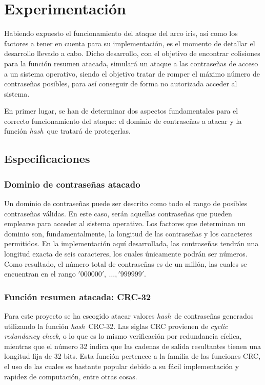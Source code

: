 \documentclass[12pt,spanish,listoffigures,listoftables,listofalgorithms]{tfgetsinf}
\newcommand{\hash}{\textit{hash}}
\begin{document}
\chapter{Experimentación}

Habiendo expuesto el funcionamiento del ataque del arco iris, así como los factores a tener en cuenta para su implementación, es el momento de detallar el desarrollo llevado a cabo. Dicho desarrollo, con el objetivo de encontrar colisiones para la función resumen atacada, simulará un ataque a las contraseñas de acceso a un sistema operativo, siendo el objetivo tratar de romper el máximo número de contraseñas posibles, para así conseguir de forma no autorizada acceder al sistema.

En primer lugar, se han de determinar dos aspectos fundamentales para el correcto funcionamiento del ataque: el dominio de contraseñas a atacar y la función \hash~que tratará de protegerlas.

\section{Especificaciones}

\subsection{Dominio de contraseñas atacado}

Un dominio de contraseñas puede ser descrito como todo el rango de posibles contraseñas válidas. En este caso, serán aquellas contraseñas que pueden emplearse para acceder al sistema operativo. Los factores que determinan un dominio son, fundamentalmente, la longitud de las contraseñas y los caracteres permitidos. En la implementación aquí desarrollada, las contraseñas tendrán una longitud exacta de seis caracteres, los cuales únicamente podrán ser números. Como resultado, el número total de contraseñas es de un millón, las cuales se encuentran en el rango $'000000',~\dots, '999999'$.


\subsection{Función resumen atacada: CRC-32} \label{crc32}

Para este proyecto se ha escogido atacar valores \hash~de contraseñas generados utilizando la función \hash~CRC-32. Las siglas CRC provienen de \textit{cyclic redundancy check}, o lo que es lo mismo verificación por redundancia cíclica, mientras que el número 32 indica que las cadenas de salida resultantes tienen una longitud fija de 32 bits. Esta función pertenece a la familia de las funciones CRC, el uso de las cuales es bastante popular debido a su fácil implementación y rapidez de computación, entre otras cosas.
\end{document}
